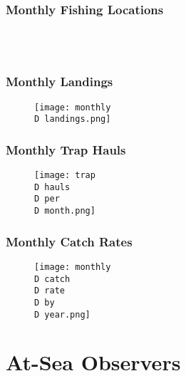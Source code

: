\begin{frame}
\frametitle{Monthly Fishing Locations}
\begin{figure}
    \centering
   \
   \
   \\
      \
         \
 \end{figure}
\end{frame}


%
%
%
\begin{frame}
\frametitle{Monthly Landings}
\begin{figure}

 \centerline{\texttt{[image: monthly\\D landings.png]}}
 \end{figure}
\end{frame}


\begin{frame}
\frametitle{Monthly Trap Hauls}
\begin{figure}


 \centerline{\texttt{[image: trap\\D hauls\\D per\\D month.png]}}

 \end{figure}
\end{frame}


%
%
\begin{frame}
\frametitle{Monthly Catch Rates}
\begin{figure}


 \centerline{\texttt{[image: monthly\\D catch\\D rate\\D by\\D year.png]}}

 \end{figure}
\end{frame}


%
%
\section{At-Sea Observers}
